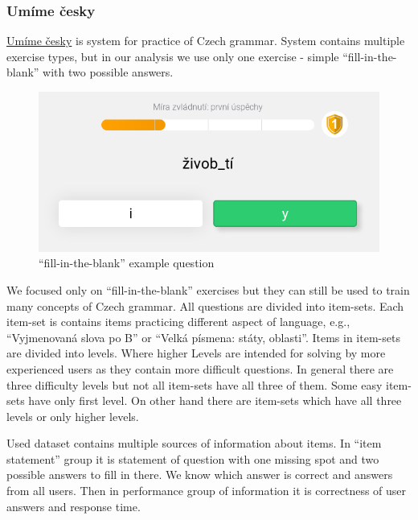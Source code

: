 \documentclass[
  digital, %
  table,   %
  nolof,     %
  nolot,     %
  nocover
]{fithesis3}
\begin{document}
\subsubsection{Umíme česky}\label{umime-cesky}


\href{https://umimecesky.cz/}{Umíme česky} is system for practice of
Czech grammar. System contains multiple exercise types, but in our
analysis we use only one exercise - simple ``fill-in-the-blank'' with
two possible answers. 

\begin{figure}
\centering
\includegraphics{img/umimecesky_doplnovacka}
\caption{``fill-in-the-blank'' example question}
\end{figure}

We focused only on ``fill-in-the-blank'' exercises but they can still be
used to train many concepts of Czech grammar. All questions are divided into item-sets. Each item-set is contains items practicing different aspect of language, e.g., ``Vyjmenovaná slova po B'' or ``Velká písmena: státy, oblasti''. Items in item-sets are divided into levels. Where higher Levels are intended for solving by more experienced users as they contain more difficult questions. In general there are three difficulty levels but not all item-sets have all three of them. Some easy item-sets have only first level. On other hand there are item-sets which have all three levels or only higher levels.


Used dataset contains multiple sources of information about items. In ``item statement'' group it is statement of question with one missing spot and two possible answers to fill in there. We know which answer is correct and answers from all users. Then in performance group of information it is correctness of user answers and response time.
\end{document}
